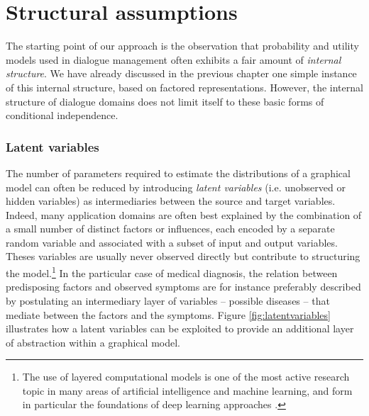 \section{Structural assumptions}
\label{sec:rmotivation}

The starting point of our approach is the observation that probability and utility models used in dialogue management often exhibits a fair amount of \textit{internal structure}.  
We have already discussed in the previous chapter one simple instance of this internal structure, based on factored representations. However, the internal structure of dialogue domains does not limit itself to these basic forms of conditional independence. 



\subsubsection*{Latent variables}
 
The number of parameters required to estimate the distributions of a graphical model can often be reduced by introducing \textit{latent variables} (i.e. unobserved or hidden variables) as intermediaries between the source and target variables. Indeed, many application domains are often best explained by the combination of a small number of distinct factors or influences, each encoded by a separate random variable and associated with a subset of input and output variables. Theses variables are usually never observed directly but contribute to structuring the model.\footnote{The use of layered computational models is one of the most active research topic in many areas of artificial intelligence and machine learning, and form in particular the foundations of deep learning approaches \citep{Bengio:2009}.} In the particular case of medical diagnosis, the relation between predisposing factors and observed symptoms are for instance preferably described by postulating an intermediary layer of variables -- possible diseases -- that mediate between the factors and the symptoms.  Figure \ref{fig:latentvariables} illustrates how a latent variables can be exploited to provide an additional layer of abstraction within a graphical model.

